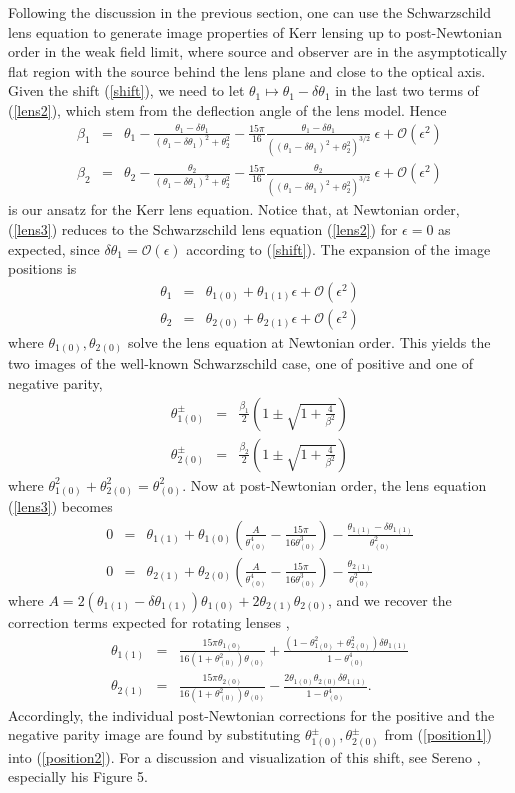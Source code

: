 \documentclass[prd,12pt,a4paper,showpacs]{revtex4}
\def\dx{\delta\theta_{1(1)}}
\def\xo{\theta_1}
\def\xt{\theta_2}
\def\xn{\theta_{(0)}}
\def\xon{\theta_{1(0)}}
\def\xoo{\theta_{1(1)}}
\def\xtn{\theta_{2(0)}}
\def\xto{\theta_{2(1)}}
\def\z{\beta}
\def\zo{\z_1}
\def\zt{\z_2}
\begin{document}
Following the discussion in the previous section, one can 
use the Schwarzschild lens equation to generate image 
properties of Kerr lensing up to post-Newtonian order in the weak field limit, 
where source and observer are in the asymptotically flat region with the source behind
the lens plane and close to the optical axis. 
Given the shift (\ref{shift}), we need to let $\xo\mapsto\xo-\delta\xo$ in the last two terms of (\ref{lens2}), 
which stem from the deflection angle of the lens model. Hence
\begin{eqnarray}
\zo&=&\xo-\frac{\xo-\delta\xo}{(\xo-\delta\xo)^2+\xt^2}-\frac{15\pi}{16}\frac{\xo-\delta\xo}{((\xo-\delta\xo)^2+\xt^2)^{3/2}}\ \epsilon+\mathcal{O}(\epsilon^2)\nonumber \\
\zt&=&\xt-\frac{\xt}{(\xo-\delta\xo)^2+\xt^2}-\frac{15\pi}{16}\frac{\xt}{((\xo-\delta\xo)^2+\xt^2)^{3/2}}\ \epsilon+\mathcal{O}(\epsilon^2)
\label{lens3}
\end{eqnarray}
is our ansatz for the Kerr lens equation. 
Notice that, at Newtonian order, (\ref{lens3}) reduces to the 
Schwarzschild lens equation (\ref{lens2}) for $\epsilon=0$ as expected, since 
$\delta\xo=\mathcal{O}(\epsilon)$  according to (\ref{shift}). 
The expansion of the image positions is
\begin{eqnarray}
\xo&=&\xon+\xoo \epsilon +\mathcal{O}(\epsilon^2) \nonumber \\
\xt&=&\xtn+\xto \epsilon +\mathcal{O}(\epsilon^2)
\label{position}
\end{eqnarray}
where $\xon,\xtn$ solve the lens equation at Newtonian order. 
This yields the two images of the 
well-known Schwarzschild case, one of positive and one of negative parity,
\begin{eqnarray}
\xon^\pm&=&\frac{\zo}{2}\left(1\pm\sqrt{1+\frac{4}{\z^2}}\right) \nonumber \\
\xtn^\pm&=&\frac{\zt}{2}\left(1\pm\sqrt{1+\frac{4}{\z^2}}\right)
\label{position1}
\end{eqnarray}
where $\xon^2+\xtn^2=\xn^2$.
Now at post-Newtonian order, the lens equation (\ref{lens3}) becomes
\begin{eqnarray*}
0&=&\xoo+\xon\left(\frac{A}{\xn^4}-\frac{15\pi}{16\xn^3}\right)-\frac{\xoo-\dx}{\xn^2}\\
0&=&\xto+\xtn\left(\frac{A}{\xn^4}-\frac{15\pi}{16\xn^3}\right)-\frac{\xto}{\xn^2}
\end{eqnarray*}
where $A=2(\xoo-\dx)\xon+2\xto\xtn$, and we recover the correction terms 
expected for 
rotating lenses \cite{sereno1},
\begin{eqnarray}
\xoo&=&\frac{15\pi\xon}{16(1+\xn^2)\xn}+\frac{(1-\xon^2+\xtn^2)\dx}{1-\xn^4}\nonumber\\
\xto&=&\frac{15\pi\xtn}{16(1+\xn^2)\xn}-\frac{2\xon\xtn\dx}{1-\xn^4}.
\label{position2}
\end{eqnarray}
Accordingly, the individual post-Newtonian corrections 
for the positive and the negative parity 
image are found by substituting $\xon^\pm, \xtn^\pm$ 
from (\ref{position1}) into (\ref{position2}). For a discussion and 
visualization of this shift, see Sereno \cite{sereno2}, especially his Figure 5. 
\end{document}
